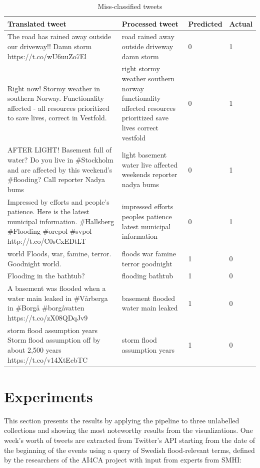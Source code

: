 \begin{table}
  \center
  \caption{Miss-classified tweets}
  \begin{tabular}{|L{0.35\textwidth}|L{0.35\textwidth}|l|l|}
    \hline
    Translated tweet & Processed tweet & Predicted & Actual \\
    \hline
    The road has rained away outside our driveway!! Damn storm https://t.co/wU6uuZo7El &
    road rained away outside driveway damn storm & 0 & 1 \\
    \hline
    Right now! Stormy weather in southern Norway. Functionality affected - all resources prioritized to save lives, correct in Vestfold. &
    right stormy weather southern norway functionality affected resources prioritized save lives correct vestfold & 0 & 1\\
    \hline
    AFTER LIGHT! Basement full of water? Do you live in \#Stockholm and are affected by this weekend's
    \#flooding? Call reporter Nadya bums &
    light basement water live affected weekends reporter nadya bums & 0 & 1\\
    \hline
    Impressed by efforts and people's patience. Here is the latest municipal information. \#Hallsberg
    \#Flooding \#orepol \#svpol http://t.co/C0sCxEDtLT &
    impressed efforts peoples patience latest municipal information & 0 & 1 \\
    \hline
    world Floods, war, famine, terror. Goodnight world. & 
    floods war famine terror goodnight & 1 & 0 \\
    \hline
    Flooding in the bathtub? & 
    flooding bathtub & 1 & 0 \\
    \hline
    A basement was flooded when a water main leaked in \#Vårberga in \#Borgå \#borgåvatten https://t.co/zX08QDqJv9 & 
    basement flooded water main leaked & 1 & 0 \\
    \hline
    storm flood assumption years Storm flood assumption off by about 2,500 years https://t.co/v14XtEcbTC & 
    storm flood assumption years & 1 & 0 \\
    \hline
  \end{tabular}
  \label{tab:tweets_missclassified}
\end{table}


\section{Experiments}%
\label{sec:Experiments}

This section presents the results by applying the pipeline to three unlabelled collections and
showing the most noteworthy results from the visualizations. One week's worth of tweets are
extracted from Twitter's API starting from the date of the beginning of the events using a query of
Swedish flood-relevant terms, defined by the researchers of the AI4CA project with input from
experts from SMHI:

